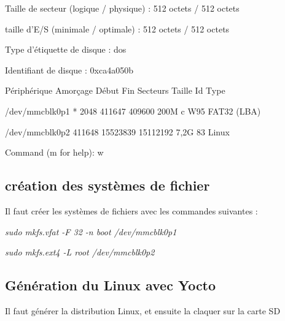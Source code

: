 {\begin{minipage}{0.9\textwidth}
Taille de secteur (logique / physique) : 512 octets / 512 octets

taille d'E/S (minimale / optimale) : 512 octets / 512 octets

Type d'étiquette de disque : dos

Identifiant de disque : 0xca4a050b



Périphérique Amorçage Début Fin Secteurs Taille Id Type

/dev/mmcblk0p1 * 2048 411647 409600 200M c W95 FAT32 (LBA)

/dev/mmcblk0p2 411648 15523839 15112192 7,2G 83 Linux





Command (m for help): w

\end{minipage}}

\subsection{création des systèmes de fichier}

Il faut créer les systèmes de fichiers avec les commandes suivantes : 


\textit{sudo mkfs.vfat -F 32 -n boot /dev/mmcblk0p1}

\textit{sudo mkfs.ext4 -L root /dev/mmcblk0p2}



\subsection{Génération du Linux avec Yocto}



Il faut générer la distribution Linux, et ensuite la claquer sur la carte SD

